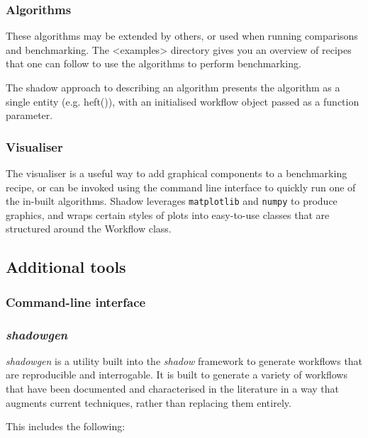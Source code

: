 \documentclass{article}
\begin{document}
\begin{multicols}{2}
\subsubsection*{Algorithms}
These algorithms may be extended by others, or used when running comparisons
and benchmarking. The <examples> directory gives you an overview of recipes
that one can follow to use the algorithms to perform benchmarking. 

The shadow approach to describing an algorithm presents the algorithm as a
single entity (e.g. heft()), with an initialised workflow object passed as a
function parameter. 


\subsubsection*{Visualiser}
The visualiser is a useful way to add graphical components to a benchmarking recipe, or can be invoked using the command line interface to quickly run one of the in-built algorithms. Shadow leverages \texttt{matplotlib} and \texttt{numpy} to produce graphics, and wraps certain styles of plots into easy-to-use classes that are structured around the Workflow class. 

\subsection*{Additional tools}
\subsubsection*{Command-line interface}
\subsubsection*{\textit{shadowgen}}

\textit{shadowgen} is a utility built into the \textit{shadow} framework to
generate workflows that are reproducible and interrogable. It is built to
generate a variety of workflows that have been documented and characterised in
the literature in a way that augments current techniques, rather than
replacing them entirely. 

This includes the following: 


\end{multicols}
\end{document}

